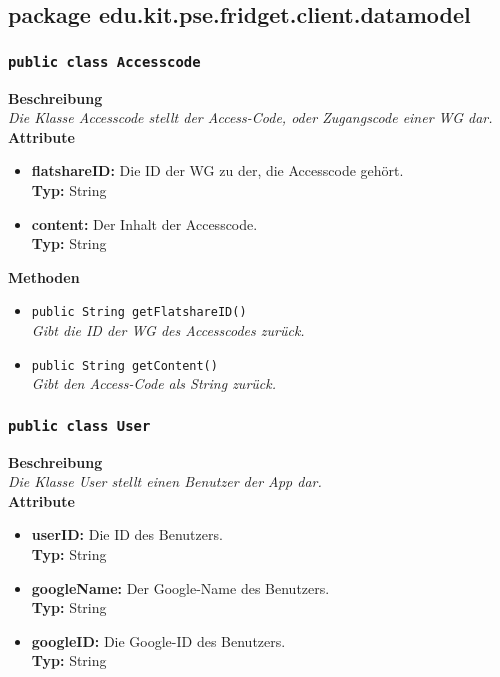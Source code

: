 \subsection{package edu.kit.pse.fridget.client.datamodel}
\subsubsection{\texttt{public class Accesscode}}

	\textbf{Beschreibung} \\
	\textit{Die Klasse Accesscode stellt der Access-Code, oder Zugangscode einer WG dar.} \\
	
	\textbf{Attribute}
	\begin{itemize}
		\item \textbf{flatshareID:} Die ID der WG zu der, die Accesscode gehört. \\
		\textbf{Typ:} String

		\item \textbf{content:} Der Inhalt der Accesscode.\\
		\textbf{Typ:} String
	\end{itemize}

	\textbf{Methoden}
	\begin{itemize}
		\item{\texttt{public String getFlatshareID()}}\\
		\textit{Gibt die ID der WG des Accesscodes zurück.}\\
		\item{\texttt{public String getContent()}}\\
		\textit{Gibt den Access-Code als String zurück.}\\
	\end{itemize}

	

\subsubsection{\texttt{public class User}}

	\textbf{Beschreibung} \\
	\textit{Die Klasse User stellt einen Benutzer der App dar.}\\
	
	\textbf{Attribute}
	\begin{itemize}
		\item \textbf{userID:} Die ID des Benutzers. \\
		\textbf{Typ:} String
		\item \textbf{googleName:} Der Google-Name des Benutzers. \\
		\textbf{Typ:} String
		\item \textbf{googleID:} Die Google-ID des Benutzers. \\
		\textbf{Typ:} String
	\end{itemize}

